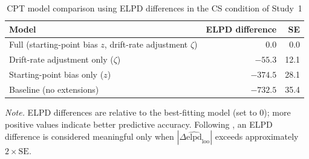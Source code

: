 \documentclass[man,floatsintext]{apa7}
\begin{document}
\begin{table}[!htbp]
\centering
\begin{threeparttable}\small
\caption{CPT model comparison using ELPD differences in the CS condition of Study~1}
\label{tab:cpt_mc_cs_study1}
\begin{tabularx}{\linewidth}{@{} >{\raggedright\arraybackslash}X rr @{}}
\toprule
\textbf{Model} & \textbf{ELPD difference} & \textbf{SE} \\
\midrule
Full (starting-point bias $z$, drift-rate adjustment $\zeta$) & 0.0 & 0.0 \\
Drift-rate adjustment only ($\zeta$) & $-55.3$ & 12.1 \\
Starting-point bias only ($z$) & $-374.5$ & 28.1 \\
Baseline (no extensions) & $-732.5$ & 35.4 \\
\bottomrule
\end{tabularx}
\begin{tablenotes}
\item \textit{Note.} ELPD differences are relative to the best-fitting model (set to 0); more positive values indicate better predictive accuracy. Following \textcite{vehtari_practical_2017}, an ELPD difference is considered meaningful only when $|\Delta\widehat{\mathrm{elpd}}_{\mathrm{loo}}|$ exceeds approximately $2 \times \mathrm{SE}$. 
\end{tablenotes}
\end{threeparttable}
\end{table}
\end{document}
